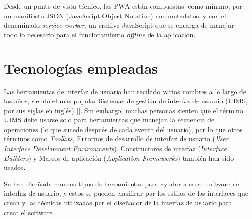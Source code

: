 Desde un punto de vista técnico, las PWA están compuestas, como mínimo, por un manifiesto JSON (JavaScript Object Notation) con metadatos, y con el denominado \textit{service worker}, un archivo JavaScript que se encarga de manejar todo lo necesario para el funcionamiento \textit{offline} de la aplicación.

\section{Tecnologías empleadas}

Las herramientas de interfaz de usuario han recibido varios nombres a lo largo de los años, siendo el más popular Sistemas de gestión de interfaz de usuario (UIMS, por sus siglas en inglés) [\cite{31}]. Sin embargo, muchas personas sienten que el término UIMS debe usarse solo para herramientas que manejan la secuencia de operaciones (lo que sucede después de cada evento del usuario), por lo que otros términos como \textit{Toolkits}, Entornos de desarrollo de interfaz de usuario (\textit{User Interface Development Environments}), Constructores de interfaz (\textit{Interface Builders}) y Marcos de aplicación (\textit{Application Frameworks}) también han sido usados.

Se han diseñado muchos tipos de herramientas para ayudar a crear software de interfaz de usuario, y estos se pueden clasificar por los estilos de las interfaces que crean y las técnicas utilizadas por el diseñador de la interfaz de usuario para crear el software.



